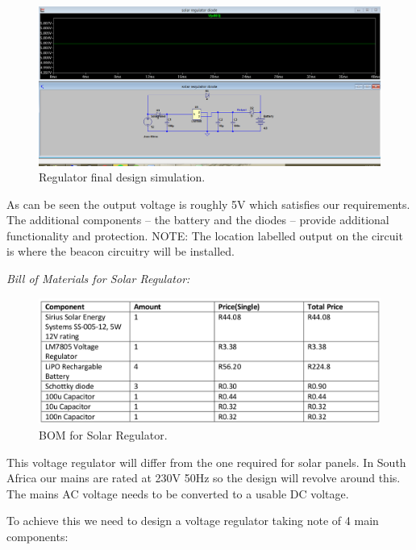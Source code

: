 \begin{figure}[H]
\begin{center}
\includegraphics[scale=0.3]{data/power/5.png}
\caption{Regulator final design simulation.}
\label{fig:pow-5}
\end{center}
\end{figure}

As can be seen the output voltage is roughly 5V which satisfies our requirements. The additional
components – the battery and the diodes – provide additional functionality and protection. NOTE:
The location labelled output on the circuit is where the beacon circuitry will be installed.

\textit{Bill of Materials for Solar Regulator:}

\begin{figure}[H]
\begin{center}
\includegraphics[scale=0.3]{data/power/tb1.png}
\caption{BOM for Solar Regulator.}
\label{fig:pow-BOM}
\end{center}
\end{figure}

This voltage regulator will differ from the one required for solar panels. In South Africa our mains are
rated at 230V 50Hz so the design will revolve around this. The mains AC voltage needs to be
converted to a usable DC voltage.

To achieve this we need to design a voltage regulator taking note of 4 main components:

